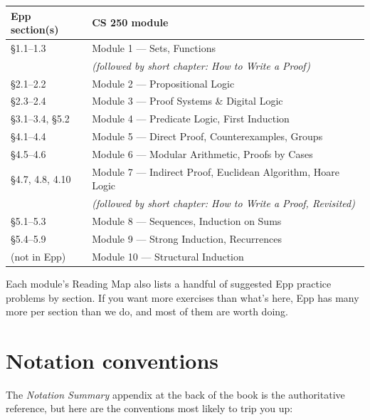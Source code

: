 \documentclass[11pt]{article}
\begin{document}
\begin{center}
\begin{tabular}{l l}
\toprule
\textbf{Epp section(s)} & \textbf{CS 250 module} \\
\midrule
§1.1--1.3                          & Module 1 --- Sets, Functions \\
                                   & \emph{(followed by short chapter: How to Write a Proof)} \\
§2.1--2.2                          & Module 2 --- Propositional Logic \\
§2.3--2.4                          & Module 3 --- Proof Systems \& Digital Logic \\
§3.1--3.4, §5.2                    & Module 4 --- Predicate Logic, First Induction \\
§4.1--4.4                          & Module 5 --- Direct Proof, Counterexamples, Groups \\
§4.5--4.6                          & Module 6 --- Modular Arithmetic, Proofs by Cases \\
§4.7, 4.8, 4.10                    & Module 7 --- Indirect Proof, Euclidean Algorithm, Hoare Logic \\
                                   & \emph{(followed by short chapter: How to Write a Proof, Revisited)} \\
§5.1--5.3                          & Module 8 --- Sequences, Induction on Sums \\
§5.4--5.9                          & Module 9 --- Strong Induction, Recurrences \\
(not in Epp)                       & Module 10 --- Structural Induction \\
\bottomrule
\end{tabular}
\end{center}

Each module's Reading Map also lists a handful of suggested Epp practice problems by section. If you want more exercises than what's here, Epp has many more per section than we do, and most of them are worth doing.

\section*{Notation conventions}

The \emph{Notation Summary} appendix at the back of the book is the authoritative reference, but here are the conventions most likely to trip you up:
\end{document}
